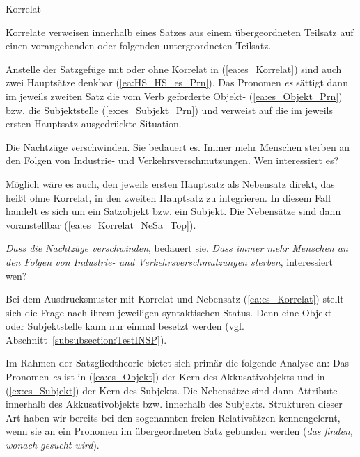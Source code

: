 \begin{Definition}{Korrelat}

\noindent 
Korrelate verweisen innerhalb eines Satzes aus einem übergeordneten Teilsatz auf einen vorangehenden oder folgenden untergeordneten Teilsatz. 
\end{Definition}



Anstelle der Satzgefüge mit oder ohne Korrelat in (\ref{ea:es_Korrelat}) sind auch zwei Hauptsätze denkbar (\ref{ea:HS_HS_es_Prn}). Das Pronomen \textit{es} sättigt dann im jeweils zweiten Satz die vom Verb geforderte Objekt- (\ref{ea:es_Objekt_Prn}) bzw. die Subjektstelle (\ref{ex:es_Subjekt_Prn}) und verweist auf die im jeweils ersten Hauptsatz ausgedrückte Situation.

\ea \label{ea:HS_HS_es_Prn}
\ea \label{ea:es_Objekt_Prn} Die Nachtzüge verschwinden. Sie bedauert es.
\ex \label{ex:es_Subjekt_Prn} Immer mehr Menschen sterben an den Folgen von Industrie- und Verkehrsverschmutzungen. Wen interessiert es? 
\z 
\z 

Möglich wäre es auch, den jeweils ersten Hauptsatz als Nebensatz direkt, das heißt ohne Korrelat, in den zweiten Hauptsatz zu integrieren. In diesem Fall handelt es sich um ein Satzobjekt bzw. ein Subjekt. Die Nebensätze sind dann voranstellbar (\ref{ea:es_Korrelat_NeSa_Top}).

\ea \label{ea:es_Korrelat_NeSa_Top}
\ea \label{ea:es_Objekt_NeSa_Top} \textit{Dass die Nachtzüge verschwinden}, bedauert sie. 
\ex \label{ex:es_Subjekt_NeSa_Top} \textit{Dass immer mehr Menschen an den Folgen von Industrie- und Verkehrsverschmutzungen sterben}, interessiert wen? 
\z 
\z 

Bei dem Ausdrucksmuster mit Korrelat und Nebensatz (\ref{ea:es_Korrelat}) stellt sich die Frage nach ihrem jeweiligen syntaktischen Status. Denn eine Objekt- oder Subjektstelle kann nur einmal besetzt werden (vgl. Abschnitt~\ref{subsubsection:TestINSP}). 

Im Rahmen der Satzgliedtheorie bietet sich primär die folgende Analyse an: Das Pronomen \textit{es} ist in (\ref{ea:es_Objekt}) der Kern des Akkusativobjekts und in (\ref{ex:es_Subjekt}) der Kern des Subjekts. Die Nebensätze sind dann Attribute innerhalb des Akkusativobjekts bzw. innerhalb des Subjekts. Strukturen dieser Art haben wir bereits bei den sogenannten freien Relativsätzen kennengelernt, wenn sie an ein Pronomen im übergeordneten Satz gebunden werden (\textit{das finden, wonach gesucht wird}).


